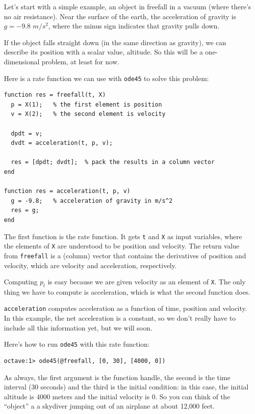 \documentclass{book}
\begin{document}
Let's start with a simple example, an object in freefall in a vacuum
(where there's no air resistance). Near the surface of the earth, the
acceleration of gravity is $g = -9.8$ $m/s^2$, where the minus sign
indicates that gravity pulls down.

If the object falls straight down (in the same direction as gravity),
we can describe its position with a scalar value, altitude. So
this will be a one-dimensional problem, at least for now.

Here is a rate function we can use with {\tt ode45} to solve
this problem:

\begin{verbatim}
function res = freefall(t, X)
  p = X(1);   % the first element is position
  v = X(2);   % the second element is velocity

  dpdt = v;             
  dvdt = acceleration(t, p, v);

  res = [dpdt; dvdt];  % pack the results in a column vector
end

function res = acceleration(t, p, v)
  g = -9.8;   % acceleration of gravity in m/s^2
  res = g;
end
\end{verbatim}

The first function is the rate function. It gets {\tt t} and
{\tt X} as input variables, where the elements of {\tt X} are understood
to be position and velocity. The return value from {\tt freefall}
is a (column) vector that contains the derivatives of position
and velocity, which are velocity and acceleration, respectively. 

Computing $p_t$ is easy because we are given velocity
as an element of {\tt X}. The only thing we have to compute is
acceleration, which is what the second function does.

{\tt acceleration} computes acceleration as a function of time,
position and velocity. In this example, the net acceleration is
a constant, so we don't really have to include all this information
yet, but we will soon.

Here's how to run {\tt ode45} with this rate function:

\begin{verbatim}
octave:1> ode45(@freefall, [0, 30], [4000, 0])
\end{verbatim}
 
As always, the first argument is the function handle, the second
is the time interval (30 seconds) and the third is the initial
condition: in this case, the initial altitude is 4000 meters and
the initial velocity is 0. So you can think of the ``object'' a
a skydiver jumping out of an airplane at about 12,000 feet.
\end{document}
